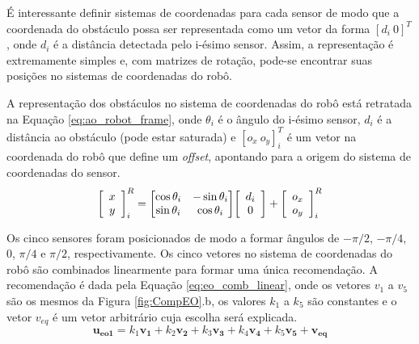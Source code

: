 		
		
		É interessante definir sistemas de coordenadas para cada sensor de modo que a coordenada
		do obstáculo possa ser representada como um vetor da forma $[d_i\ 0]^T$, onde $d_i$ é a 
		distância detectada pelo i-ésimo sensor. Assim, a representação é extremamente simples
		e, com matrizes de rotação, pode-se encontrar suas posições no sistemas de coordenadas
		do robô. 
		
		A representação dos obstáculos no sistema de coordenadas do robô está retratada na 
		Equação \ref{eq:ao_robot_frame}, onde $\theta_i$ é o ângulo do i-ésimo sensor, $d_i$ é a 
		distância ao obstáculo (pode estar saturada) e $[o_x\ o_y]_i^T$ é um vetor na coordenada
		do robô que define um \textit{offset}, apontando para a origem do sistema de coordenadas
		do sensor.
		\begin{equation}
			\label{eq:ao_robot_frame}
			\mleft[ 
			\begin{array}{c c}
				x \\ y
			\end{array}
			\mright]_i^R = \mleft[
			\begin{matrix}
		  		\cos{\theta_i} & -\sin{\theta_i} \\
		  		\sin{\theta_i} & \cos{\theta_i} \\
			\end{matrix}
			\mright] \mleft[ 
			\begin{array}{c c}
				d_i \\ 0
			\end{array}
			\mright] + \mleft[ 
			\begin{array}{c c}
				o_x \\ o_y
			\end{array}
			\mright]_i^R
		\end{equation}

		Os cinco sensores foram posicionados de modo a formar ângulos de $-\pi/2$, $-\pi/4$,
		$0$, $\pi/4$ e $\pi/2$, respectivamente. Os cinco vetores no sistema de coordenadas do 
		robô são combinados linearmente para formar uma única recomendação. A recomendação é 
		dada pela Equação \ref{eq:eo_comb_linear}, onde os vetores $v_1$ a $v_5$ são os mesmos 
		da Figura \ref{fig:CompEO}.b, os valores $k_1$ a $k_5$ são constantes e o vetor $v_{eq}$ 
		é um vetor arbitrário cuja escolha será explicada.
		\begin{equation}
			\label{eq:eo_comb_linear}
			\mathbf{u_{eo1}} = k_1 \mathbf{v_1} + k_2 \mathbf{v_2} + k_3 \mathbf{v_3} + 
			k_4 \mathbf{v_4} + k_5 \mathbf{v_5} + \mathbf{v_{eq}}
		\end{equation}
		
